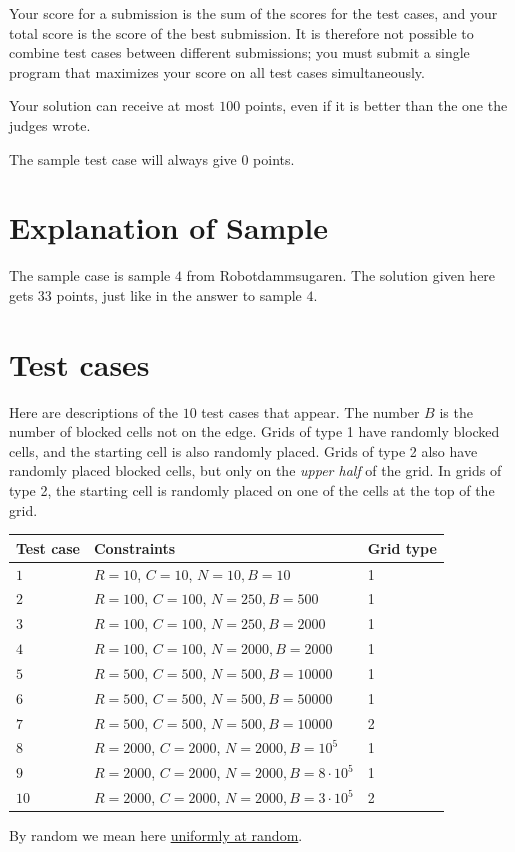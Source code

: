 Your score for a submission is the sum of the scores for the test cases, and your total score is the score of the best submission.
It is therefore not possible to combine test cases between different submissions; you must submit a single program that
maximizes your score on all test cases simultaneously.

Your solution can receive at most $100$ points, even if it is better than the one the judges wrote.

The sample test case will always give $0$ points.


\section*{Explanation of Sample}
The sample case is sample $4$ from Robotdammsugaren. The solution given here gets $33$ points, just
like in the answer to sample $4$.

\section*{Test cases}
Here are descriptions of the $10$ test cases that appear. The number $B$ is the number of blocked cells not on the edge.
Grids of type 1 have randomly blocked cells, and the starting cell is also randomly placed.
Grids of type 2 also have randomly placed blocked cells, but only on the \textit{upper half}
of the grid. In grids of type 2, the starting cell is randomly placed on one of the cells at the top of the grid.

\noindent
\begin{tabular}{| l | l | l |}
\hline
Test case & Constraints                                     & Grid type \\ \hline
$1$       & $R = 10$, $C = 10$, $N = 10, B = 10$           & 1  \\ \hline
$2$       & $R = 100$, $C = 100$, $N = 250, B = 500$         & 1   \\ \hline
$3$       & $R = 100$, $C = 100$, $N = 250, B = 2000$     & 1   \\ \hline
$4$       & $R = 100$, $C = 100$, $N = 2000, B = 2000$ & 1  \\ \hline
$5$       & $R = 500$, $C = 500$, $N = 500, B = 10000$    & 1   \\ \hline
$6$       & $R = 500$, $C = 500$, $N = 500, B = 50000$   & 1   \\ \hline
$7$       & $R = 500$, $C = 500$, $N = 500, B = 10000$    & 2   \\ \hline
$8$       & $R = 2000$, $C = 2000$, $N = 2000, B = 10^5$  & 1  \\ \hline
$9$       & $R = 2000$, $C = 2000$, $N = 2000, B = 8 \cdot 10^5$ & 1   \\ \hline
$10$      & $R = 2000$, $C = 2000$, $N = 2000, B = 3 \cdot 10^5$ & 2   \\ \hline
\end{tabular}

By random we mean here \href{https://en.wikipedia.org/wiki/Discrete_uniform_distribution}{uniformly at random}.
